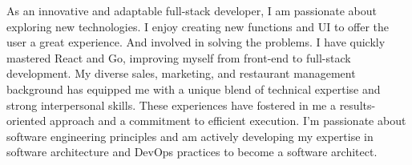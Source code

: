 As an innovative and adaptable full-stack developer, I am passionate about exploring new technologies. I enjoy creating new functions and UI to offer the user a great experience. And involved in solving the problems. I have quickly mastered React and Go, improving myself from front-end to full-stack development. My diverse sales, marketing, and restaurant management background has equipped me with a unique blend of technical expertise and strong interpersonal skills. These experiences have fostered in me a results-oriented approach and a commitment to efficient execution. I'm passionate about software engineering principles and am actively developing my expertise in software architecture and DevOps practices to become a software architect.